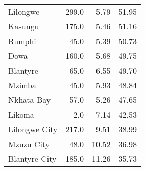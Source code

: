 \begin{tabular}{lrrr}
Lilongwe      &   299.0 &           5.79 &               51.95 \\
Kasungu       &   175.0 &           5.46 &               51.16 \\
Rumphi        &    45.0 &           5.39 &               50.73 \\
Dowa          &   160.0 &           5.68 &               49.75 \\
Blantyre      &    65.0 &           6.55 &               49.70 \\
Mzimba        &    45.0 &           5.93 &               48.84 \\
Nkhata Bay    &    57.0 &           5.26 &               47.65 \\
Likoma        &     2.0 &           7.14 &               42.53 \\
Lilongwe City &   217.0 &           9.51 &               38.99 \\
Mzuzu City    &    48.0 &          10.52 &               36.98 \\
Blantyre City &   185.0 &          11.26 &               35.73 \\
\bottomrule
\end{tabular}

